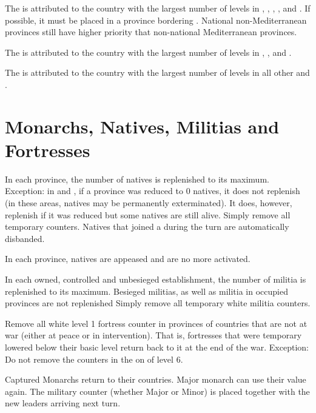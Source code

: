 \aparag[Mediterranean]
\bparag The  is attributed to the country with the largest
number of \TradeFLEET levels in , , ,
,  and .
\bparag If possible, it must be placed in a province bordering
\regionMediterrannee. National non-Mediterranean provinces still have higher
priority that non-national Mediterranean provinces.


\aparag[Indian] The  is attributed to the country with the largest
number of \TradeFLEET levels in , ,  and
.

\aparag[Atlantic] The  is attributed to the country with the
largest number of \TradeFLEET levels in all other \STZ and \CTZ.

\section{Monarchs, Natives, Militias and Fortresses}
\label{chInter:Natives, Militias, Fortresses}

\aparag[Natives] In each \ROTW province, the number of natives is replenished
to its maximum.
\bparag Exception: in \continentAmerica and \continentSiberia, if a province
was reduced to 0 natives, it does not replenish (in these areas, natives may
be permanently exterminated). It does, however, replenish if it was reduced
but some natives are still alive.
\bparag Simply remove all temporary  counters.
\bparag Natives that joined a \LeaderC during the turn are automatically
disbanded.

\aparag[Appeasement] In each \ROTW province, natives are appeased and are no
more activated.

\aparag[Militia] In each owned, controlled and unbesieged establishment, the
number of militia is replenished to its maximum.
\bparag Besieged militias, as well as militia in occupied provinces are not
replenished
\bparag Simply remove all temporary white militia counters.

\aparag[Fortresses] Remove all white level 1 fortress counter in provinces of
countries that are not at war (either at peace or in intervention). That is,
fortresses that were temporary lowered below their basic level return back to
it at the end of the war.
\bparag Exception: Do not remove the counters in the \ROTW on \COL of level
6.

 Captured Monarchs return to their countries.
\bparag Major monarch can use their value again.
\bparag The military counter (whether Major or Minor) is placed together with
the new leaders arriving next turn.

